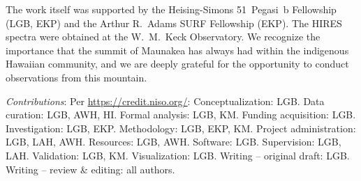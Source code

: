 \documentclass[11pt,twocolumn,tighten,linenumbers]{aastex63}
\begin{document}
\acknowledgements

The work itself was supported by the Heising-Simons 51~Pegasi~b Fellowship
(LGB, EKP) and the Arthur R.~Adams SURF Fellowship (EKP).
The HIRES spectra were obtained at the W.~M.~Keck Observatory.
We recognize the importance that the summit of Maunakea has always had
within the indigenous Hawaiian community, and we are deeply grateful 
for the opportunity to conduct observations from this mountain.



{\it \large Contributions}: Per \url{https://credit.niso.org/}:
Conceptualization: LGB.
Data curation: LGB, AWH, HI.
Formal analysis: LGB, KM.
Funding acquisition: LGB.
Investigation: LGB, EKP.
Methodology: LGB, EKP, KM.
Project administration: LGB, LAH, AWH.
Resources: LGB, AWH.
Software: LGB.
Supervision: LGB, LAH.
Validation: LGB, KM.
Visualization: LGB.
Writing – original draft: LGB.
Writing – review \& editing: all authors.




\clearpage 
\end{document}
